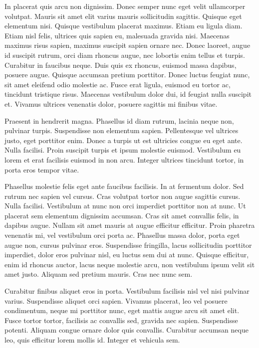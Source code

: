 \documentclass{article}
\begin{document}
In placerat quis arcu non dignissim. Donec semper nunc eget velit ullamcorper volutpat. Mauris sit amet elit varius mauris sollicitudin sagittis. Quisque eget elementum nisi. Quisque vestibulum placerat maximus. Etiam eu ligula diam. Etiam nisl felis, ultrices quis sapien eu, malesuada gravida nisi. Maecenas maximus risus sapien, maximus suscipit sapien ornare nec. Donec laoreet, augue id suscipit rutrum, orci diam rhoncus augue, nec lobortis enim tellus et turpis. Curabitur in faucibus neque. Duis quis ex rhoncus, euismod massa dapibus, posuere augue. Quisque accumsan pretium porttitor. Donec luctus feugiat nunc, sit amet eleifend odio molestie ac. Fusce erat ligula, euismod eu tortor ac, tincidunt tristique risus. Maecenas vestibulum dolor dui, id feugiat nulla suscipit et. Vivamus ultrices venenatis dolor, posuere sagittis mi finibus vitae.

Praesent in hendrerit magna. Phasellus id diam rutrum, lacinia neque non, pulvinar turpis. Suspendisse non elementum sapien. Pellentesque vel ultrices justo, eget porttitor enim. Donec a turpis ut est ultricies congue eu eget ante. Nulla facilisi. Proin suscipit turpis et ipsum molestie euismod. Vestibulum eu lorem et erat facilisis euismod in non arcu. Integer ultrices tincidunt tortor, in porta eros tempor vitae.

Phasellus molestie felis eget ante faucibus facilisis. In at fermentum dolor. Sed rutrum nec sapien vel cursus. Cras volutpat tortor non augue sagittis cursus. Nulla facilisi. Vestibulum at nunc non orci imperdiet porttitor non at nunc. Ut placerat sem elementum dignissim accumsan. Cras sit amet convallis felis, in dapibus augue. Nullam sit amet mauris at augue efficitur efficitur. Proin pharetra venenatis mi, vel vestibulum orci porta ac. Phasellus massa dolor, porta eget augue non, cursus pulvinar eros. Suspendisse fringilla, lacus sollicitudin porttitor imperdiet, dolor eros pulvinar nisl, eu luctus sem dui at nunc. Quisque efficitur, enim id rhoncus auctor, lacus neque molestie arcu, non vestibulum ipsum velit sit amet justo. Aliquam sed pretium mauris. Cras nec nunc sem.

Curabitur finibus aliquet eros in porta. Vestibulum facilisis nisl vel nisi pulvinar varius. Suspendisse aliquet orci sapien. Vivamus placerat, leo vel posuere condimentum, neque mi porttitor nunc, eget mattis augue arcu sit amet elit. Fusce tortor tortor, facilisis ac convallis sed, gravida nec sapien. Suspendisse potenti. Aliquam congue ornare dolor quis convallis. Curabitur accumsan neque leo, quis efficitur lorem mollis id. Integer et vehicula sem.
\end{document}
